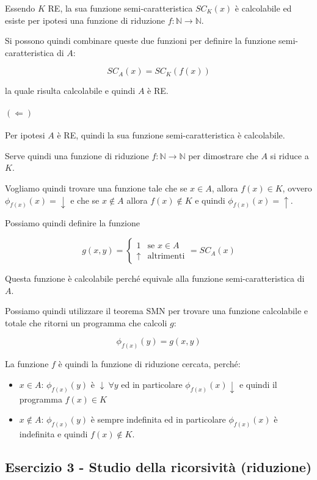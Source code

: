 Essendo $K$ RE, la sua funzione semi-caratteristica $SC_K(x)$ è calcolabile ed esiste per ipotesi una funzione di riduzione $f : \mathbb{N} \rightarrow \mathbb{N}$.

Si possono quindi combinare queste due funzioni per definire la funzione semi-caratteristica di $A$:

$$
SC_A(x) = SC_K(f(x))
$$ 

la quale risulta calcolabile e quindi $A$ è RE.

\paragraph{$(\Leftarrow)$}

Per ipotesi $A$ è RE, quindi la sua funzione semi-caratteristica è calcolabile.

Serve quindi una funzione di riduzione $f : \mathbb{N} \rightarrow \mathbb{N}$ per dimostrare che $A$ si riduce a $K$.

Vogliamo quindi trovare una funzione tale che se $x \in A$, allora $f(x) \in K$, ovvero $\phi_{f(x)}(x) = \downarrow$ e che se $x \notin A$ allora $f(x) \notin K$ e quindi $\phi_{f(x)}(x) = \uparrow $.

Possiamo quindi definire la funzione

$$
g(x,y) = \begin{cases}
1 &\text{se } x \in A \\
\uparrow &\text{altrimenti}
\end{cases} = SC_A(x)
$$

Questa funzione è calcolabile perché equivale alla funzione semi-caratteristica di $A$. 

Possiamo quindi utilizzare il teorema SMN per trovare una funzione calcolabile e totale che ritorni un programma che calcoli $g$:

$$
\phi_{f(x)}(y) = g(x,y)
$$ 

La funzione $f$ è quindi la funzione di riduzione cercata, perché:

\begin{itemize}
	\item $x \in A$: $\phi_{f(x)}(y)$ è $\downarrow \: \forall y$ ed in particolare $\phi_{f(x)}(x) \downarrow$ e quindi il programma $f(x) \in K$
	\item $x \notin A$: $\phi_{f(x)}(y)$ è sempre indefinita ed in particolare $\phi_{f(x)}(x) $ è indefinita e quindi $f(x) \notin K$.
\end{itemize}


\subsection{Esercizio 3 - Studio della ricorsività (riduzione)}

